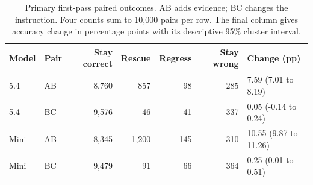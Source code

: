 \begin{table}[htbp]\centering\small
\caption{Primary first-pass paired outcomes. AB adds evidence; BC changes the instruction. Four counts sum to 10,000 pairs per row. The final column gives accuracy change in percentage points with its descriptive 95\% cluster interval.}\label{tab:transitions}
\begin{tabularx}{\linewidth}{llrrrrX}\toprule
Model & Pair & Stay correct & Rescue & Regress & Stay wrong & Change (pp) \\\midrule
5.4 & AB & 8,760 & 857 & 98 & 285 & 7.59 (7.01 to 8.19) \\
5.4 & BC & 9,576 & 46 & 41 & 337 & 0.05 (-0.14 to 0.24) \\
Mini & AB & 8,345 & 1,200 & 145 & 310 & 10.55 (9.87 to 11.26) \\
Mini & BC & 9,479 & 91 & 66 & 364 & 0.25 (0.01 to 0.51) \\
\bottomrule
\end{tabularx}
\end{table}